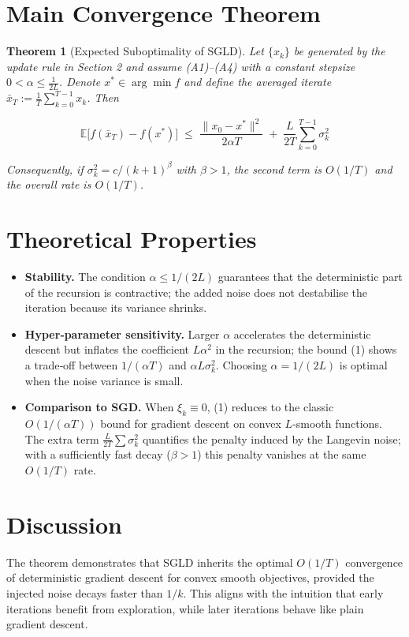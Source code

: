 \documentclass{article}
\newtheorem{theorem}{Theorem}
\begin{document}
\section*{Main Convergence Theorem}
\begin{theorem}[Expected Suboptimality of SGLD]\label{thm:main}
Let $\{x_k\}$ be generated by the update rule in Section 2 and assume (A1)–(A4) with a constant stepsize $0<\alpha\le\frac{1}{2L}$. Denote $x^{*}\in\arg\min f$ and define the averaged iterate $\bar x_T:=\frac{1}{T}\sum_{k=0}^{T-1}x_k$. Then

\[
\boxed{\;
\mathbb{E}\big[f(\bar x_T)-f(x^{*})\big]\;\le\;
\frac{\|x_{0}-x^{*}\|^{2}}{2\alpha T}
\;+\;
\frac{L}{2T}\sum_{k=0}^{T-1}\sigma_k^{2}
\;}
\tag{1}
\]

Consequently, if $\sigma_k^{2}=c/(k+1)^{\beta}$ with $\beta>1$, the second term is $O(1/T)$ and the overall rate is $O(1/T)$.
\end{theorem}

\section*{Theoretical Properties}
\begin{itemize}
    \item \textbf{Stability.} The condition $\alpha\le1/(2L)$ guarantees that the deterministic part of the recursion is contractive; the added noise does not destabilise the iteration because its variance shrinks.
    \item \textbf{Hyper‑parameter sensitivity.} Larger $\alpha$ accelerates the deterministic descent but inflates the coefficient $L\alpha^{2}$ in the recursion; the bound (1) shows a trade‑off between $1/(\alpha T)$ and $\alpha L\sigma_k^{2}$. Choosing $\alpha=1/(2L)$ is optimal when the noise variance is small.
    \item \textbf{Comparison to SGD.} When $\xi_k\equiv0$, (1) reduces to the classic $O(1/(\alpha T))$ bound for gradient descent on convex $L$‑smooth functions. The extra term $\frac{L}{2T}\sum\sigma_k^{2}$ quantifies the penalty induced by the Langevin noise; with a sufficiently fast decay ($\beta>1$) this penalty vanishes at the same $O(1/T)$ rate.
\end{itemize}

\section*{Discussion}
The theorem demonstrates that SGLD inherits the optimal $O(1/T)$ convergence of deterministic gradient descent for convex smooth objectives, provided the injected noise decays faster than $1/k$. This aligns with the intuition that early iterations benefit from exploration, while later iterations behave like plain gradient descent.
\end{document}
